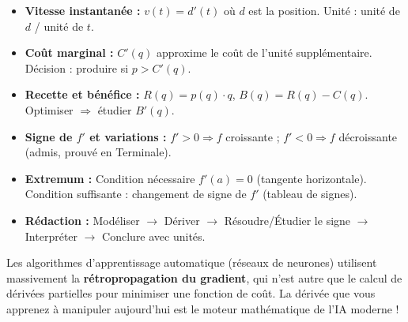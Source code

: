 \documentclass[11pt]{article}
\begin{document}
\begin{aretenir}
\begin{itemize}
\item \textbf{Vitesse instantanée :} $v(t) = d'(t)$ où $d$ est la position. Unité : unité de $d$ / unité de $t$.
\item \textbf{Coût marginal :} $C'(q)$ approxime le coût de l'unité supplémentaire. Décision : produire si $p > C'(q)$.
\item \textbf{Recette et bénéfice :} $R(q) = p(q)\cdot q$, $B(q) = R(q) - C(q)$. Optimiser $\Rightarrow$ étudier $B'(q)$.
\item \textbf{Signe de $f'$ et variations :} $f'>0 \Rightarrow f$ croissante ; $f'<0 \Rightarrow f$ décroissante (admis, prouvé en Terminale).
\item \textbf{Extremum :} Condition nécessaire $f'(a)=0$ (tangente horizontale). Condition suffisante : changement de signe de $f'$ (tableau de signes).
\item \textbf{Rédaction :} Modéliser $\rightarrow$ Dériver $\rightarrow$ Résoudre/Étudier le signe $\rightarrow$ Interpréter $\rightarrow$ Conclure avec unités.
\end{itemize}
\end{aretenir}

\begin{savaistu}
Les algorithmes d'apprentissage automatique (réseaux de neurones) utilisent massivement la \textbf{rétropropagation du gradient}, qui n'est autre que le calcul de dérivées partielles pour minimiser une fonction de coût. La dérivée que vous apprenez à manipuler aujourd'hui est le moteur mathématique de l'IA moderne !
\end{savaistu}
\end{document}
